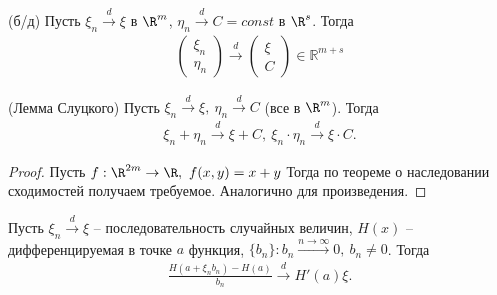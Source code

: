 \begin{proposition}
	(б/д) Пусть $\xi_n \xrightarrow{d} \xi$ в $\R^m$, $\eta_n \xrightarrow{d} C = const$ в $\R^s$. Тогда
	\begin{gather*}
	    \begin{pmatrix}
		\xi _{n}\\
		\eta _{n}
    	\end{pmatrix}\xrightarrow{d}
    	\begin{pmatrix}
    		\xi \\
    		C
    	\end{pmatrix} \in \mathbb{R}^{m+s}
	\end{gather*}
\end{proposition}

\begin{corollary}
	(Лемма Слуцкого) Пусть $\xi_n \xrightarrow{d} \xi,\ \eta_n \xrightarrow{d} C$ (все в $\R^m$). Тогда 
	\begin{gather*}
	    \xi_n+\eta_n \xrightarrow{d} \xi + C,\ \xi_n\cdot\eta_n \xrightarrow{d} \xi \cdot C.
	\end{gather*}
\end{corollary}

\begin{proof}
	Пусть $f:\R^{2m}\rightarrow \R,\ f(x, y) = x + y$ Тогда по теореме о наследовании сходимостей получаем требуемое. Аналогично для произведения.
\end{proof}

\begin{example}
	Пусть $\xi_n \xrightarrow{d} \xi$ -- последовательность случайных величин, $H(x)$ -- дифференцируемая в точке $a$ функция, $\{b_n\}: b_n \xrightarrow{n\rightarrow \infty} 0,\ b_n \ne 0$. Тогда
	\begin{gather*}
	    \frac{H\left(a + \xi_nb_n\right) - H(a)}{b_n}\xrightarrow{d} H'(a)\xi.
	\end{gather*}
\end{example}

